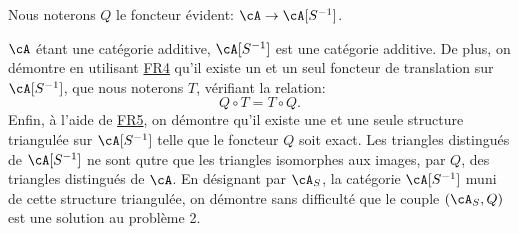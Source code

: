 Nous noterons $Q$ le foncteur \'evident: $\cA\to \cA[S^{-1}]$. 

$\cA$ \'etant une cat\'egorie additive, $\cA[S^{-1}]$ est une cat\'egorie 
additive. De plus, on d\'emontre en utilisant \hyperlink{VIII:FR4}{FR4} qu'il 
existe un et un seul foncteur de translation sur $\cA[S^{-1}]$, que nous 
noterons $T$, v\'erifiant la relation: 
\[
  Q\circ T = T\circ Q \text{.}
\]
Enfin, \`a l'aide de \hyperlink{VIII:FR5}{FR5}, on d\'emontre qu'il existe une 
et une seule structure triangul\'ee sur $\cA[S^{-1}]$ telle que le foncteur $Q$ 
soit exact. Les triangles distingu\'es de $\cA[S^{-1}]$ ne sont qutre que les 
triangles isomorphes aux images, par $Q$, des triangles distingu\'es de $\cA$. 
En d\'esignant par $\cA_S$, la cat\'egorie $\cA[S^{-1}]$ muni de cette 
structure triangul\'ee, on d\'emontre sans difficult\'e que le couple 
$(\cA_S,Q)$ est une solution au probl\`eme 2. 









